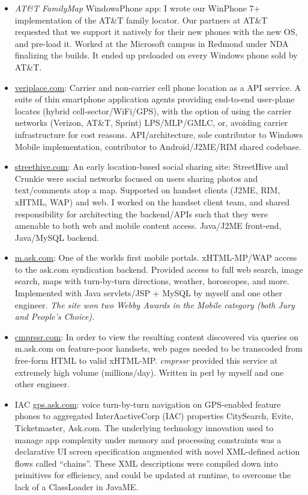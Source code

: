 \begin{itemize}
		\item {\em  AT\&T FamilyMap} WindowsPhone app: I wrote our WinPhone 7+
			implementation of the AT\&T family locator. Our partners at AT\&T requested that 
			we support it natively for their new phones with the new OS, and pre-load it. 
			Worked at the Microsoft campus in Redmond under NDA
			finalizing the builds.
			It ended up preloaded on every Windows phone sold by AT\&T. \\[-16pt]

		\item \url{veriplace.com}: Carrier and non-carrier cell phone location as a API service. 
		A suite of thin smartphone application agents providing
		end-to-end user-plane locates (hybrid cell-sector/WiFi/GPS), with the option of using the 
		carrier networks (Verizon, AT\&T, Sprint) LPS/MLP/GMLC, or, avoiding carrier infrastructure for cost reasons.
		API/architecture, sole contributor to Windows Mobile implementation, contributor to Android/J2ME/RIM
		shared codebase.

		\item \url{streethive.com}: An early location-based social sharing site: 
		StreetHive and Crunkie were social networks 
		focused on users sharing photos and text/comments atop a map. Supported on 
		handset clients (J2ME, RIM, xHTML, WAP) and web.  
		I worked on the handset client team, and shared responsibility for architecting the backend/APIs such that
		they were amenable to both web and 
		mobile content access. Java/J2ME front-end, Java/MySQL backend.

		\item \url{m.ask.com}: One of the worlds first mobile portals.  xHTML-MP/WAP access to the ask.com
		syndication backend. Provided access to full web search, 
		image search, maps with turn-by-turn directions, weather, horoscopes, and more. 
		Implemented with Java servlets/JSP + MySQL 
		by myself and one other engineer.  {\em The site won two Webby Awards in the Mobile category 
		(both Jury and People's Choice).}

		\item \url{cmprssr.com}: In order to view the resulting content discovered via queries on m.ask.com
		on feature-poor handsets, web 
		pages needed to be transcoded from free-form HTML to valid xHTML-MP. {\it cmprssr} provided this service at
		extremely high volume (millions/day). Written in perl by myself and one other engineer.

  		\item IAC \url{gps.ask.com}: voice turn-by-turn navigation on GPS-enabled feature phones
		 to aggregated InterAactiveCorp (IAC) properties CitySearch, Evite, Ticketmaster, Ask.com. 
		 The underlying technology innovation
		  used to manage app complexity under memory and processing constraints was a declarative UI screen specification
		   augmented with novel XML-defined action flows called ``chains''. These XML descriptions were compiled down
		    into primitives for efficiency, and could be updated at runtime, to overcome the lack of a ClassLoader 
		    in JavaME. 
	   

\end{itemize}
